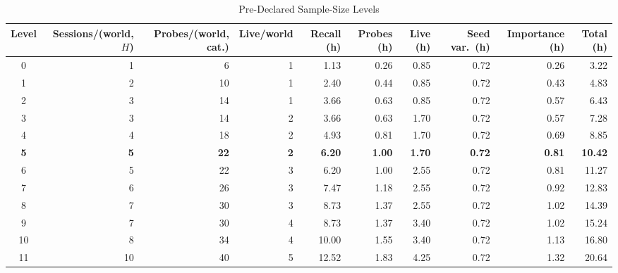 \documentclass[letterpaper,journal,onecolumn]{IEEEtran}
\begin{document}
\begin{table}[H]
\centering\footnotesize
\caption{Pre-Declared Sample-Size Levels}
\label{tab:ladder}
\begin{adjustbox}{max width=\linewidth}
\begin{tabular}{@{}crrrrrrrrr@{}}
\toprule
Level & Sessions/(world, $H$) & Probes/(world, cat.) & Live/world & Recall (h) & Probes (h) & Live (h) & Seed var.\ (h) & Importance (h) & Total (h) \\
\midrule
0 & 1 & 6 & 1 & 1.13 & 0.26 & 0.85 & 0.72 & 0.26 & 3.22 \\
1 & 2 & 10 & 1 & 2.40 & 0.44 & 0.85 & 0.72 & 0.43 & 4.83 \\
2 & 3 & 14 & 1 & 3.66 & 0.63 & 0.85 & 0.72 & 0.57 & 6.43 \\
3 & 3 & 14 & 2 & 3.66 & 0.63 & 1.70 & 0.72 & 0.57 & 7.28 \\
4 & 4 & 18 & 2 & 4.93 & 0.81 & 1.70 & 0.72 & 0.69 & 8.85 \\
\textbf{5} & \textbf{5} & \textbf{22} & \textbf{2} & \textbf{6.20} & \textbf{1.00} & \textbf{1.70} & \textbf{0.72} & \textbf{0.81} & \textbf{10.42} \\
6 & 5 & 22 & 3 & 6.20 & 1.00 & 2.55 & 0.72 & 0.81 & 11.27 \\
7 & 6 & 26 & 3 & 7.47 & 1.18 & 2.55 & 0.72 & 0.92 & 12.83 \\
8 & 7 & 30 & 3 & 8.73 & 1.37 & 2.55 & 0.72 & 1.02 & 14.39 \\
9 & 7 & 30 & 4 & 8.73 & 1.37 & 3.40 & 0.72 & 1.02 & 15.24 \\
10 & 8 & 34 & 4 & 10.00 & 1.55 & 3.40 & 0.72 & 1.13 & 16.80 \\
11 & 10 & 40 & 5 & 12.52 & 1.83 & 4.25 & 0.72 & 1.32 & 20.64 \\
\bottomrule
\end{tabular}
\end{adjustbox}
\end{table}



\end{document}
